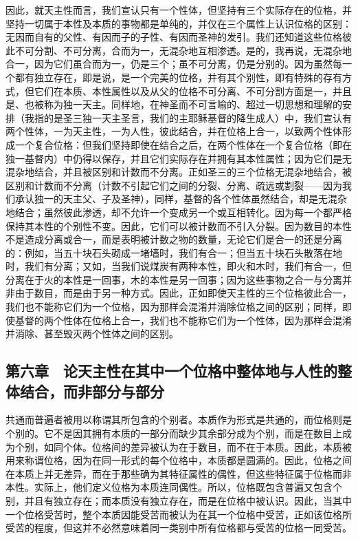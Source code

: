 因此，就天主性而言，我们宣认只有一个性体，但坚持有三个实际存在的位格，并坚持一切属于本性及本质的事物都是单纯的，并仅在三个属性上认识位格的区别：无因而自有的父性、有因而子的子性、有因而圣神的发引。我们还知道这些位格彼此不可分割、不可分离，合而为一，无混杂地互相渗透。是的，我再说，无混杂地合一，因为它们虽合而为一，仍是三个；虽不可分离，仍是分别的。因为虽然每一个都有独立存在，即是说，是一个完美的位格，并有其个别性，即有特殊的存有方式，但它们在本质、本性属性以及从父的位格不可分离、不可分割方面是一，并且是、也被称为独一天主。同样地，在神圣而不可言喻的、超过一切思想和理解的安排（我指的是圣三独一天主圣言，我们的主耶稣基督的降生成人）中，我们宣认有两个性体，一为天主性，一为人性，彼此结合，并在位格上合一，以致两个性体形成一个复合位格：但我们坚持即使在结合之后，在两个性体在一个复合位格（即在独一基督内）中仍得以保存，并且它们实际存在并拥有其本性属性；因为它们是无混杂地结合，并且被区别和计数而不分离。正如圣三的三个位格无混杂地结合，被区别和计数而不分离（计数不引起它们之间的分裂、分离、疏远或割裂——因为我们承认独一的天主父、子及圣神），同样，基督的各个性体虽然结合，却是无混杂地结合；虽然彼此渗透，却不允许一个变成另一个或互相转化。因为每一个都严格保持其本性的个别性不变。因此，它们可以被计数而不引入分裂。因为数目的本性不是造成分离或合一，而是表明被计数之物的数量，无论它们是合一的还是分离的：例如，当五十块石头砌成一堵墙时，我们有合一；但当五十块石头散落在地时，我们有分离；又如，当我们说煤炭有两种本性，即火和木时，我们有合一，但分离在于火的本性是一回事，木的本性是另一回事；因为这些事物之合一与分离并非由于数目，而是由于另一种方式。因此，正如即使天主性的三个位格彼此合一，我们也不能称它们为一个位格，因为那样会混淆并消除位格之间的区别；同样，即使基督的两个性体在位格上合一，我们也不能称它们为一个性体，因为那样会混淆并消除、甚至毁灭两个性体之间的区别。\par


\subsection{第六章　论天主性在其中一个位格中整体地与人性的整体结合，而非部分与部分}

共通而普遍者被用以称谓其所包含的个别者。本质作为形式是共通的，而位格则是个别的。它不是因其拥有本质的一部分而缺少其余部分成为个别，而是在数目上成为个别，如同个体。位格间的差异被认为在于数目，而不在于本质。因此，本质被用来称谓位格，因为在同一形式的每个位格中，本质都是圆满的。因此，位格之间在本质上并无差异，而在于那些确为其特征属性的偶性，但这些特征属于位格而非本性。实际上，他们定义位格为本质连同偶性。所以，位格既包含普遍又包含个别，并且有独立存在；而本质没有独立存在，而是在位格中被认识。因此，当其中一个位格受苦时，整个本质因能受苦而被认为在其一个位格中受苦，正如该位格所受苦的程度，但这并不必然意味着同一类别中所有位格都与受苦的位格一同受苦。\par

